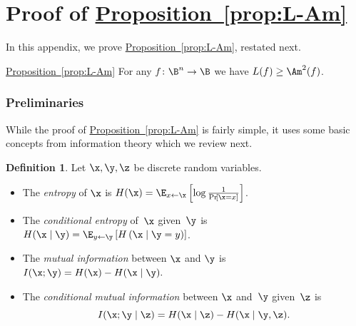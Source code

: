 \documentclass[11pt]{article}
\numberwithin{equation}{section}
\theoremstyle{definition}
\newtheorem{definition}[theorem]{Definition}
\theoremstyle{plain}
\newcommand{\expref}[2]{\hyperref[#2]{#1~\ref{#2}}}
\theoremstyle{definition}\newtheorem{notation}[theorem]{Notation}\theoremstyle{plain}
\begin{document}
\appendix


\section{\label{sec:L-Am}Proof of \expref{Proposition}{prop:L-Am}}

In this appendix, we prove \expref{Proposition}{prop:L-Am}, restated next. 
\begin{restated}{\expref{Proposition}{prop:L-Am}}
For any $f\colon\B^{n}\to\B$ we have $L(f)\geq\Am^{2}(f)$. 
\end{restated}


\subsubsection*{Preliminaries}

While the proof of \expref{Proposition}{prop:L-Am} is fairly simple, it uses some basic
concepts from information theory which we review next. 
\begin{definition}
\label{def:information}Let $\x,\y,\z$ be discrete random variables. 
\begin{itemize}
\item The \emph{entropy} of $\x$ is $H(\x)=\E_{x\gets\x}\left[\log\frac{1}{\Pr\!\left[\x=x\right]}\right]$. 
\item The \emph{conditional entropy} of~$\x$ given~$\y$ is $H(\x\mid\y)=\E_{y\gets\y}\left[H\left(\x\mid\y=y\right)\right]$. 
\item The \emph{mutual information} between $\x$ and $\y$ is $I(\x;\y)=H(\x)-H(\x\mid\y).$ 
\item The \emph{conditional mutual information} between $\x$ and~$\y$
given~$\z$ is 
\[
I(\x;\y\mid\z)=H(\x\mid\z)-H(\x\mid\y,\z).
\]
\end{itemize}
\end{definition}
\end{document}
